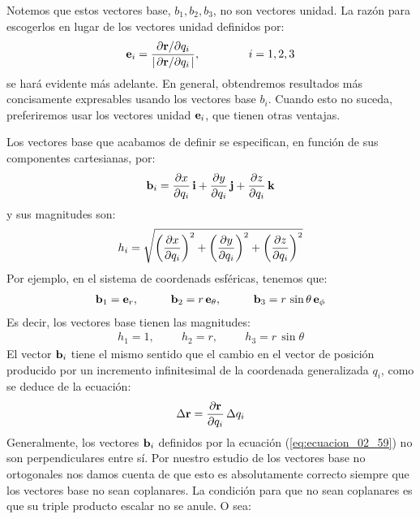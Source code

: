 \documentclass[12pt]{article}
\begin{document}
Notemos que estos vectores base, $b_{1}, b_{2}, b_{3}$, no son vectores unidad. La razón para escogerlos en lugar de los vectores unidad definidos por:
\begin{align}
\vb{e}_{i} = \dfrac{\pdv*{\vb{r}}{q_{i}}}{\abs{\pdv*{\vb{r}}{q_{i}}}}, \hspace{1.5cm} i = 1, 2, 3
\label{eq:ecuacion_02_58}
\end{align}
se hará evidente más adelante. En general, obtendremos resultados más concisamente expresables usando los vectores base $b_{i}$. Cuando 
esto no suceda, preferiremos usar los vectores unidad $\vb{e}_{i}$, que tienen otras ventajas. 
\par
Los vectores base que acabamos de definir se especifican, en función de sus componentes cartesianas, por:
\begin{align}
    \vb{b}_{i} = \pdv{x}{q_{i}} \, \vb{i} + \pdv{y}{q_{i}} \, \vb{j} + \pdv{z}{q_{i}} \, \vb{k}
    \label{eq:ecuacion_02_59}  
\end{align} 
y sus magnitudes son:
\begin{align}
    h_{i} = \sqrt{\left( \pdv{x}{q_{i}} \right)^{2} + \left( \pdv{y}{q_{i}} \right)^{2} + \left( \pdv{z}{q_{i}} \right)^{2}}
    \label{eq:ecuacion_02_60}
\end{align}
Por ejemplo, en el sistema de coordenads esféricas, tenemos que:
\begin{align*}
    \vb{b}_{1} = \vb{e}_{r}, \hspace{1cm} \vb{b}_{2} = r \, \vb{e}_{\theta}, \hspace{1cm} \vb{b}_{3} = r \, \sin \theta \, \vb{e}_{\phi}
\end{align*}
Es decir, los vectores base tienen las magnitudes:
\begin{align*}
    h_{1} = 1, \hspace{1cm} h_{2} = r, \hspace{1cm} h_{3} = r \, \sin \theta
\end{align*}
El vector $\vb{b}_{i}$ tiene el mismo sentido que el cambio en el vector de posición producido por un incremento infinitesimal de la coordenada generalizada $q_{i}$, como se deduce de la ecuación:
\begin{align*}
    \Delta \vb{r} = \pdv{\vb{r}}{q_{i}} \, \Delta q_{i}
\end{align*}
Generalmente, los vectores $\vb{b}_{i}$ definidos por la ecuación (\ref{eq:ecuacion_02_59}) no son perpendiculares entre sí. Por nuestro estudio de los vectores base no ortogonales nos damos cuenta de que esto es absolutamente correcto siempre que los vectores base no sean coplanares. La condición para que no sean coplanares es que su triple producto escalar no se anule. O sea:
\end{document}
